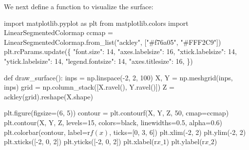 \documentclass[
  letterpaper,
  numbers=noenddot,
  DIV=11]{scrreprt}
\newenvironment{Shaded}{\begin{snugshade}}{\end{snugshade}}
\newcommand{\NormalTok}[1]{\textcolor[rgb]{0.00,0.23,0.31}{#1}}
\theoremstyle{plain}
\theoremstyle{definition}
\theoremstyle{remark}
\begin{document}
We next define a function to visualize the surface:

\begin{tcolorbox}[colframe=.grey, title=\faCode \enspace Code]

\begin{Shaded}
\begin{Highlighting}[numbers=left,,]
\NormalTok{import matplotlib.pyplot as plt}
\NormalTok{from matplotlib.colors import LinearSegmentedColormap}
\NormalTok{ccmap = LinearSegmentedColormap.from\_list("ackley", ["\#f76a05", "\#FFF2C9"])}
\NormalTok{plt.rcParams.update(\{}
\NormalTok{    "font.size": 14,}
\NormalTok{    "axes.labelsize": 16,}
\NormalTok{    "xtick.labelsize": 14,}
\NormalTok{    "ytick.labelsize": 14,}
\NormalTok{    "legend.fontsize": 14,}
\NormalTok{    "axes.titlesize": 16,}
\NormalTok{\})}

\NormalTok{def draw\_surface():}
\NormalTok{    inps = np.linspace({-}2, 2, 100)}
\NormalTok{    X, Y = np.meshgrid(inps, inps)}
\NormalTok{    grid = np.column\_stack([X.ravel(), Y.ravel()])}
\NormalTok{    Z = ackley(grid).reshape(X.shape)}
    
\NormalTok{    plt.figure(figsize=(6, 5))}
\NormalTok{    contour = plt.contourf(X, Y, Z, 50, cmap=ccmap)}
\NormalTok{    plt.contour(X, Y, Z, levels=15, colors=\textquotesingle{}black\textquotesingle{}, linewidths=0.5, alpha=0.6)}
\NormalTok{    plt.colorbar(contour, label=r\textquotesingle{}$f(x)$\textquotesingle{}, ticks=[0, 3, 6])}
\NormalTok{    plt.xlim({-}2, 2)}
\NormalTok{    plt.ylim({-}2, 2)}
\NormalTok{    plt.xticks([{-}2, 0, 2])}
\NormalTok{    plt.yticks([{-}2, 0, 2])}
\NormalTok{    plt.xlabel(r\textquotesingle{}$x\_1$\textquotesingle{})}
\NormalTok{    plt.ylabel(r\textquotesingle{}$x\_2$\textquotesingle{})}
\end{Highlighting}
\end{Shaded}

\end{tcolorbox}
\end{document}
